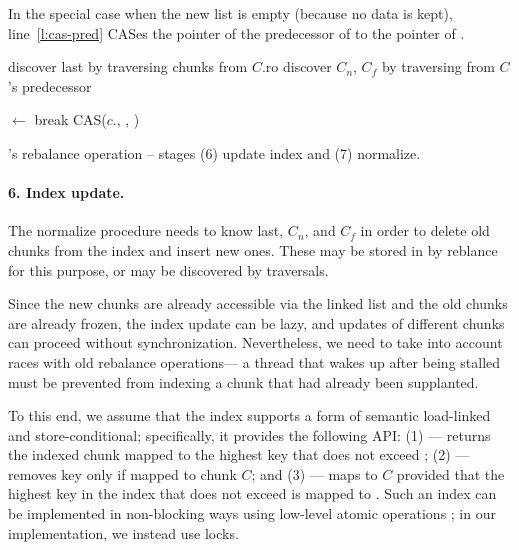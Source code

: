 In the special case when the new list is empty (because no data is kept), line~\ref{l:cas-pred} CASes  the  pointer of the predecessor of  to the   pointer of .


\begin{algorithm}[th]
\begin{algorithmic}
	\State discover  last by traversing chunks from $C$.ro
	\State discover $C_n$, $C_f$ by traversing from $C$'s predecessor
	
			\State {}
	\EndFor
	
		\Do
			\State {} $\leftarrow$ 
			 break \EndIf 
	\EndFor		
		\State CAS($c$., , )
	\EndFor		
	\EndProcedure
\end{algorithmic}
\caption{\kiwi's rebalance operation -- stages (6) update index and (7) normalize.}
\label{alg:rebalance-normal}
\end{algorithm}	

\paragraph{6. Index update.}
The normalize procedure needs to know last, $C_n$, and $C_f$ in order to delete old chunks from the index and insert new ones. These may be stored in  by reblance for this purpose, or may be discovered by traversals. 

Since the new chunks are already accessible via the linked list and the old chunks are already frozen, the index update can be lazy, and updates of different chunks can proceed without synchronization.
Nevertheless, we need to take into account races with old rebalance operations--- a thread that wakes up after being stalled must be prevented from indexing a chunk that had already been supplanted.

To this end, we assume that the index supports a form of semantic load-linked and store-conditional; specifically, it provides the following API:
(1)  --- returns the indexed chunk mapped to the highest key that does not exceed ;
(2)  --- removes key  only if mapped to chunk $C$; and
(3)  --- maps  to $C$ provided that the highest key in the index that does not exceed
 is mapped to .
Such an index can be implemented in non-blocking ways using low-level atomic operations \cite{BraginskyP2012}; in our implementation,
we instead use locks.

